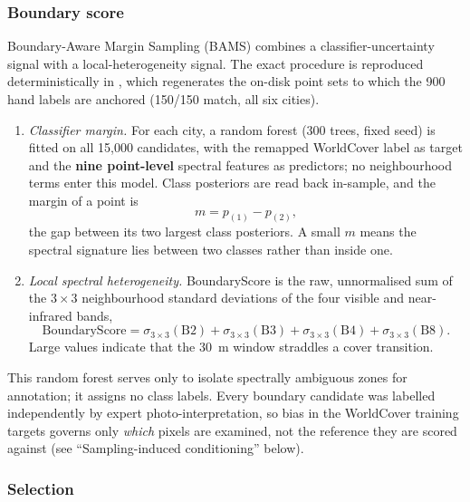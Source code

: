 \documentclass[remotesensing,article,submit,moreauthors]{Definitions/mdpi}
\begin{document}
\subsubsection*{Boundary score}

Boundary-Aware Margin Sampling (BAMS) combines a classifier-uncertainty signal
with a local-heterogeneity signal. The exact procedure is reproduced
deterministically in , which
regenerates the on-disk point sets to which the 900 hand labels are anchored
(150/150 match, all six cities).

\begin{enumerate}[leftmargin=*,labelsep=4.5mm]
\item \emph{Classifier margin.} For each city, a random forest (300 trees, fixed
  seed) is fitted on all 15,000 candidates, with the remapped WorldCover label
  as target and the \textbf{nine point-level} spectral features as predictors;
  no neighbourhood terms enter this model. Class posteriors are read back
  in-sample, and the margin of a point is
  \begin{equation}\label{eq:margin}
  m = p_{(1)} - p_{(2)},
  \end{equation}
  the gap between its two largest class posteriors. A small $m$ means the
  spectral signature lies between two classes rather than inside one.
\item \emph{Local spectral heterogeneity.} BoundaryScore is the raw,
  unnormalised sum of the $3 \times 3$ neighbourhood standard deviations of the
  four visible and near-infrared bands,
  \begin{equation}\label{eq:bscore}
  \mathrm{BoundaryScore} = \sigma_{3\times3}(\mathrm{B2}) + \sigma_{3\times3}(\mathrm{B3})
  + \sigma_{3\times3}(\mathrm{B4}) + \sigma_{3\times3}(\mathrm{B8}).
  \end{equation}
  Large values indicate that the 30~m window straddles a cover transition.
\end{enumerate}

This random forest serves only to isolate spectrally ambiguous zones for
annotation; it assigns no class labels. Every boundary candidate was labelled
independently by expert photo-interpretation, so bias in the WorldCover
training targets governs only \emph{which} pixels are examined, not the
reference they are scored against (see ``Sampling-induced conditioning''
below).

\subsubsection*{Selection}
\end{document}
